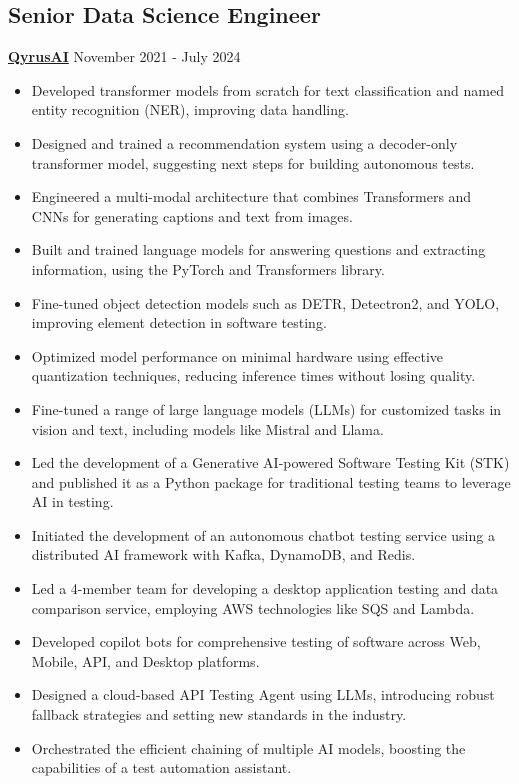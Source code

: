 \documentclass[11pt,a4paper]{article}
\begin{document}
\subsection*{Senior Data Science Engineer}
\textbf{\href{https://qyrus.ai}{QyrusAI}} \hfill November 2021 - July 2024\\
\begin{itemize}
    \item Developed transformer models from scratch for text classification and named entity recognition (NER), improving data handling.
    \item Designed and trained a recommendation system using a decoder-only transformer model, suggesting next steps for building autonomous tests.
    \item Engineered a multi-modal architecture that combines Transformers and CNNs for generating captions and text from images.
    \item Built and trained language models for answering questions and extracting information, using the PyTorch and Transformers library.
    \item Fine-tuned object detection models such as DETR, Detectron2, and YOLO, improving element detection in software testing.
    \item Optimized model performance on minimal hardware using effective quantization techniques, reducing inference times without losing quality.
    \item Fine-tuned a range of large language models (LLMs) for customized tasks in vision and text, including models like Mistral and Llama.
    \item Led the development of a Generative AI-powered Software Testing Kit (STK) and published it as a Python package for traditional testing teams to leverage AI in testing.
    \item Initiated the development of an autonomous chatbot testing service using a distributed AI framework with Kafka, DynamoDB, and Redis.
    \item Led a 4-member team for developing a desktop application testing and data comparison service, employing AWS technologies like SQS and Lambda.
    \item Developed copilot bots for comprehensive testing of software across Web, Mobile, API, and Desktop platforms.
    \item Designed a cloud-based API Testing Agent using LLMs, introducing robust fallback strategies and setting new standards in the industry.
    \item Orchestrated the efficient chaining of multiple AI models, boosting the capabilities of a test automation assistant.

\end{itemize}
\end{document}

